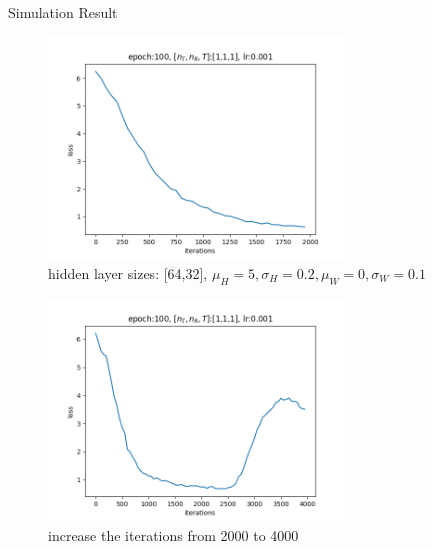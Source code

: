\documentclass[hyperref={bookmarks=false}]{beamer}
\begin{document}
\begin{frame}[allowframebreaks]{Simulation Result}

\begin{figure}
    \includegraphics[width=0.7\textwidth]{Figure_1.png}
    \caption{hidden layer sizes: [64,32], $\mu_H=5, \sigma_H=0.2, \mu_W=0, \sigma_W=0.1 $}
\end{figure}


\framebreak

\begin{figure}
    \includegraphics[width=0.7\textwidth]{Figure_2.png}
    \caption{increase the iterations from 2000 to 4000}
\end{figure}

\framebreak


\end{frame}
\end{document}

